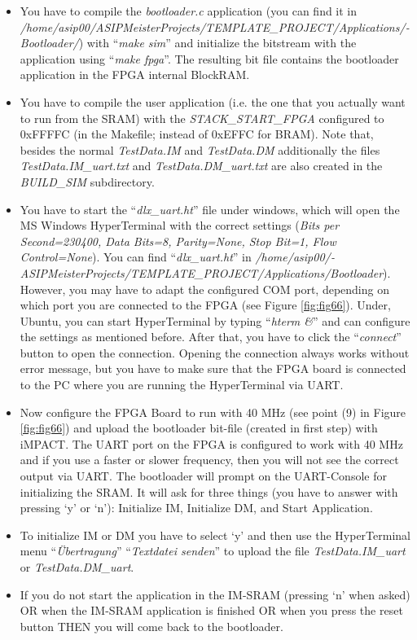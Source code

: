 \begin{itemize}
\item
  You have to compile the \emph{bootloader.c} application (you can find
  it in
  \emph{/home/asip00/­ASIPMeisterProjects/­TEMPLATE\_PROJECT/­Applications/­Bootloader/})
  with ``\emph{make sim}'' and initialize the bitstream with the
  application using ``\emph{make fpga}''. The resulting bit file
  contains the bootloader application in the FPGA internal BlockRAM.
\item
  You have to compile the user application (i.e. the one that you
  actually want to run from the SRAM) with the \emph{STACK\_START\_FPGA}
  configured to 0xFFFFC (in the Makefile; instead of 0xEFFC for BRAM).
  Note that, besides the normal \emph{TestData.IM} and
  \emph{TestData.DM} additionally the files \emph{TestData.IM\_uart.txt}
  and \emph{TestData.DM\_uart.txt} are also created in the
  \emph{BUILD\_SIM} subdirectory.
\item
  You have to start the ``\emph{dlx\_uart.ht}'' file under windows,
  which will open the MS Windows HyperTerminal with the correct settings
  (\emph{Bits per Second=230400, Data Bits=8, Parity=None, Stop Bit=1,
  Flow Control=None}). You can find ``\emph{dlx\_uart.ht}'' in
  \emph{/home/asip00/­ASIPMeisterProjects/­TEMPLATE\_PROJECT/­Applications/­Bootloader}).
  However, you may have to adapt the configured COM port, depending on
  which port you are connected to the FPGA (see
 Figure \ref{fig:fig66}). Under, Ubuntu, you can start
  HyperTerminal by typing ``\emph{hterm \&}'' and can configure the
  settings as mentioned before. After that, you have to click the
  ``\emph{connect}'' button to open the connection. Opening the
  connection always works without error message, but you have to make
  sure that the FPGA board is connected to the PC where you are running
  the HyperTerminal via UART.
\item
  Now configure the FPGA Board to run with 40 MHz (see point (9) in
  Figure \ref{fig:fig66}) and upload the bootloader
  bit-file (created in first step) with iMPACT. The UART port on the
  FPGA is configured to work with 40 MHz and if you use a faster or
  slower frequency, then you will not see the correct output via UART.
  The bootloader will prompt on the UART-Console for initializing the
  SRAM. It will ask for three things (you have to answer with pressing
  `y' or `n'): Initialize IM, Initialize DM, and Start Application.
\item
  To initialize IM or DM you have to select `y' and then use the
  HyperTerminal menu ``\emph{Übertragung}'' ``\emph{Textdatei senden}''
  to upload the file \emph{TestData.IM\_uart} or
  \emph{TestData.DM\_uart}.
\item
  If you do not start the application in the IM-SRAM (pressing `n' when
  asked) OR when the IM-SRAM application is finished OR when you press
  the reset button THEN you will come back to the bootloader.
\end{itemize}
